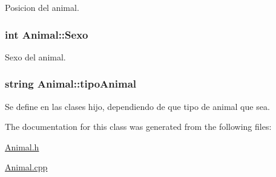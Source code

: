 Posicion del animal. 

\subsubsection[{\texorpdfstring{Sexo}{Sexo}}]{\setlength{\rightskip}{0pt plus 5cm}int Animal\+::\+Sexo}\hypertarget{classAnimal_a42b629ae5a7e0c05263a3f6e592ea116}{}\label{classAnimal_a42b629ae5a7e0c05263a3f6e592ea116}


Sexo del animal. 

\subsubsection[{\texorpdfstring{tipo\+Animal}{tipoAnimal}}]{\setlength{\rightskip}{0pt plus 5cm}string Animal\+::tipo\+Animal}\hypertarget{classAnimal_ae7a4f121949d20c359414a3002e7eff7}{}\label{classAnimal_ae7a4f121949d20c359414a3002e7eff7}


Se define en las clases hijo, dependiendo de que tipo de animal que sea. 



The documentation for this class was generated from the following files\+:\begin{DoxyCompactItemize}
\item 
\hyperlink{Animal_8h}{Animal.\+h}\item 
\hyperlink{Animal_8cpp}{Animal.\+cpp}\end{DoxyCompactItemize}
